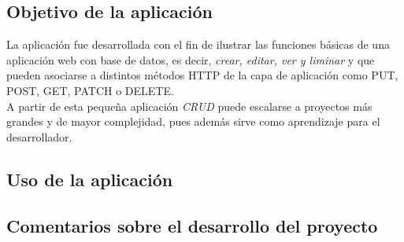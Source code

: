 \documentclass[9pt]{article}
\begin{document}
\subsection*{Objetivo de la aplicación}
La aplicación fue desarrollada con el fin de ilustrar las funciones básicas de una aplicación web con base de datos, es decir, \textit{crear, editar, ver y liminar} y que pueden asociarse a distintos métodos HTTP de la capa de aplicación como PUT, POST, GET, PATCH o DELETE. \\
A partir de esta pequeña aplicación \textit{CRUD} puede escalarse a proyectos más grandes y de mayor complejidad, pues además sirve como aprendizaje para el desarrollador.
\subsection*{Uso de la aplicación}

\subsection*{Comentarios sobre el desarrollo del proyecto}
\end{document}
